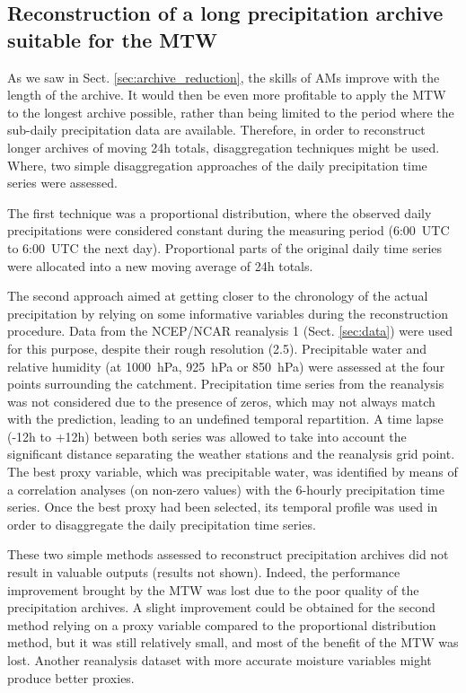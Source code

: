 \documentclass[hess, manuscript]{copernicus}
\begin{document}
	
	\subsection{Reconstruction of a long precipitation archive suitable for the MTW}
	\label{sec:reconstruction}
	
	As we saw in Sect. \ref{sec:archive_reduction}, the skills of AMs improve with the length of the archive. It would then be even more profitable to apply the MTW to the longest archive possible, rather than being limited to the period where the sub-daily precipitation data are available. Therefore, in order to reconstruct longer archives of moving 24h totals, disaggregation techniques might be used. Where, two simple disaggregation approaches of the daily precipitation time series were assessed.
	
	The first technique was a proportional distribution, where the observed daily precipitations were considered constant during the measuring period (6:00~UTC to 6:00~UTC the next day). Proportional parts of the original daily time series were allocated into a new moving average of 24h totals. 

	The second approach aimed at getting closer to the chronology of the actual precipitation by relying on some informative variables during the reconstruction procedure. Data from the NCEP/NCAR reanalysis 1 (Sect. \ref{sec:data}) were used for this purpose, despite their rough resolution (2.5\textdegree). Precipitable water and relative humidity (at 1000~hPa, 925~hPa or 850~hPa) were assessed at the four points surrounding the catchment. Precipitation time series from the reanalysis was not considered due to the presence of zeros, which may not always match with the prediction, leading to an undefined temporal repartition. A time lapse (-12h to +12h) between both series was allowed to take into account the significant distance separating the weather stations and the reanalysis grid point. The best proxy variable, which was precipitable water, was identified by means of a correlation analyses (on non-zero values) with the 6-hourly precipitation time series. Once the best proxy had been selected, its temporal profile was used in order to disaggregate the daily precipitation time series.
	
	These two simple methods assessed to reconstruct precipitation archives did not result in valuable outputs (results not shown). Indeed, the performance improvement brought by the MTW was lost due to the poor quality of the precipitation archives. A slight improvement could be obtained for the second method relying on a proxy variable compared to the proportional distribution method, but it was still relatively small, and most of the benefit of the MTW was lost. Another reanalysis dataset with more accurate moisture variables might produce better proxies.
	
\end{document}
